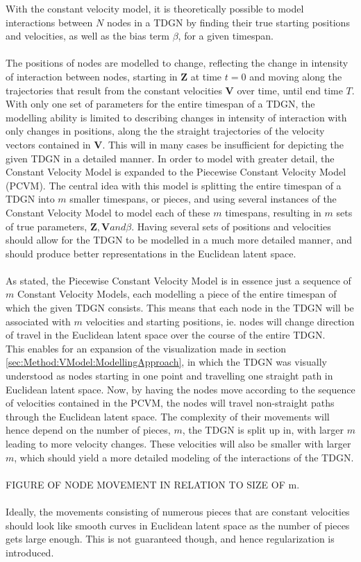With the constant velocity model, it is theoretically possible to model interactions between $N$ nodes in a TDGN by finding their true starting positions and velocities, as well as the bias term $\beta$, for a given timespan.
\\\\
The positions of nodes are modelled to change, reflecting the change in intensity of interaction between nodes, starting in $\textbf{Z}$ at time $t=0$ and moving along the trajectories that result from the constant velocities $\textbf{V}$ over time, until end time $T$.
With only one set of parameters for the entire timespan of a TDGN, the modelling ability is limited to describing changes in intensity of interaction with only changes in positions, along the the straight trajectories of the velocity vectors contained in $\textbf{V}$.
This will in many cases be insufficient for depicting the given TDGN in a detailed manner. 
In order to model with greater detail, the Constant Velocity Model is expanded to the Piecewise Constant Velocity Model (PCVM). 
The central idea with this model is splitting the entire timespan of a TDGN into $m$ smaller timespans, or pieces, and using several instances of the Constant Velocity Model to model each of these $m$ timespans, resulting in $m$ sets of true parameters, $\textbf{Z}, \textbf{V} and \beta$.
Having several sets of positions and velocities should allow for the TDGN to be modelled in a much more detailed manner, and should produce better representations in the Euclidean latent space.
\\\\
As stated, the Piecewise Constant Velocity Model is in essence just a sequence of $m$ Constant Velocity Models, each modelling a piece of the entire timespan of which the given TDGN consists. 
This means that each node in the TDGN will be associated with $m$ velocities and starting positions, ie. nodes will change direction of travel in the Euclidean latent space over the course of the entire TDGN.
\\
This enables for an expansion of the visualization made in section \ref{sec:Method:VModel:ModellingApproach}, in which the TDGN was visually understood as nodes starting in one point and travelling one straight path in Euclidean latent space.
Now, by having the nodes move according to the sequence of velocities contained in the PCVM, the nodes will travel non-straight paths through the Euclidean latent space.
The complexity of their movements will hence depend on the number of pieces, $m$, the TDGN is split up in, with larger $m$ leading to more velocity changes.
These velocities will also be smaller with larger $m$, which should yield a more detailed modeling of the interactions of the TDGN.
\\\\
FIGURE OF NODE MOVEMENT IN RELATION TO SIZE OF m.
\\\\
Ideally, the movements consisting of numerous pieces that are constant velocities should look like smooth curves in Euclidean latent space as the number of pieces gets large enough.
This is not guaranteed though, and hence regularization is introduced.


